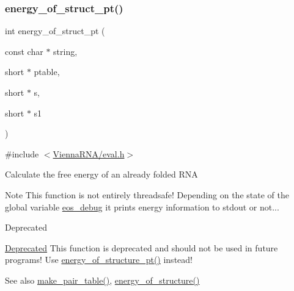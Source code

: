 \subsubsection{\texorpdfstring{energy\+\_\+of\+\_\+struct\+\_\+pt()}{energy\_of\_struct\_pt()}}
{\footnotesize\ttfamily int energy\+\_\+of\+\_\+struct\+\_\+pt (\begin{DoxyParamCaption}\item[{const char $\ast$}]{string,  }\item[{short $\ast$}]{ptable,  }\item[{short $\ast$}]{s,  }\item[{short $\ast$}]{s1 }\end{DoxyParamCaption})}



{\ttfamily \#include $<$\hyperlink{eval_8h}{Vienna\+R\+N\+A/eval.\+h}$>$}

Calculate the free energy of an already folded R\+NA

\begin{DoxyNote}{Note}
This function is not entirely threadsafe! Depending on the state of the global variable \hyperlink{group__eval__deprecated_ga567530678f6260a1a649a5beca5da4c5}{eos\+\_\+debug} it prints energy information to stdout or not...~\newline
 
\end{DoxyNote}
\begin{DoxyRefDesc}{Deprecated}
\item[\hyperlink{deprecated__deprecated000059}{Deprecated}]This function is deprecated and should not be used in future programs! Use \hyperlink{group__eval__deprecated_ga8831445966b761417e713360791299d8}{energy\+\_\+of\+\_\+structure\+\_\+pt()} instead!\end{DoxyRefDesc}


\begin{DoxySeeAlso}{See also}
\hyperlink{group__struct__utils__deprecated_ga89c32307ee50a0026f4a3131fac0845a}{make\+\_\+pair\+\_\+table()}, \hyperlink{group__eval__deprecated_gaf93986cb3cb29770ec9cca69c9fab8cf}{energy\+\_\+of\+\_\+structure()} 
\end{DoxySeeAlso}

